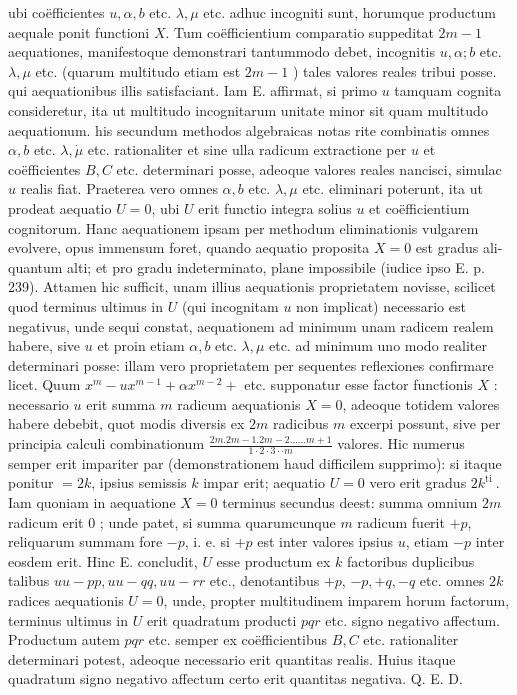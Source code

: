 \documentclass[10pt]{article}
\begin{document}
ubi coëfficientes \(u, \alpha, b\) etc. \(\lambda, \mu\) etc. adhuc incogniti sunt, horumque productum aequale ponit functioni \(X\). Tum coëfficientium comparatio suppeditat \(2 m-1\) aequationes, manifestoque demonstrari tantummodo debet, incognitis \(u, \alpha ; b\) etc. \(\lambda, \mu\) etc. (quarum multitudo etiam est \(2 m-1\) ) tales valores reales tribui posse. qui aequationibus illis satisfaciant. Iam E. affirmat, si primo \(u\) tamquam cognita consideretur, ita ut multitudo incognitarum unitate minor sit quam multitudo aequationum. his secundum methodos algebraicas notas rite combinatis omnes \(\alpha, b\) etc. \(\lambda, \dot{\mu}\) etc. rationaliter et sine ulla radicum extractione per \(u\) et coëfficientes \(B, C\) etc. determinari posse, adeoque valores reales nancisci, simulac \(u\) realis fiat. Praeterea vero omnes \(\alpha, b\) etc. \(\lambda, \mu\) etc. eliminari poterunt, ita ut prodeat aequatio \(U=0\), ubi \(U\) erit functio integra solius \(u\) et coëfficientium cognitorum. Hanc aequationem ipsam per methodum eliminationis vulgarem evolvere, opus immensum foret, quando aequatio proposita \(X=0\) est gradus ali-
quantum alti; et pro gradu indeterminato, plane impossibile (iudice ipso E. p. 239). Attamen hic sufficit, unam illius aequationis proprietatem novisse, scilicet quod terminus ultimus in \(U\) (qui incognitam \(u\) non implicat) necessario est negativus, unde sequi constat, aequationem ad minimum unam radicem realem habere, sive \(u\) et proin etiam \(\alpha, b\) etc. \(\lambda, \mu\) etc. ad minimum uno modo realiter determinari posse: illam vero proprietatem per sequentes reflexiones confirmare licet. Quum \(x^{m}-u x^{m-1}+\alpha x^{m-2}+\) etc. supponatur esse factor functionis \(X\) : necessario \(u\) erit summa \(m\) radicum aequationis \(X=0\), adeoque totidem valores habere debebit, quot modis diversis ex \(2 m\) radicibus \(m\) excerpi possunt, sive per principia calculi combinationum \(\frac{2 m .2 m-1.2 m-2 \ldots \ldots m+1}{1 \cdot 2 \cdot 3 \cdot \cdot m}\) valores. Hic numerus semper erit impariter par (demonstrationem haud difficilem supprimo): si itaque ponitur \(=2 k\), ipsius semissis \(k\) impar erit; aequatio \(U=0\) vero erit gradus \(2 k^{\text {ti }}\). Iam quoniam in aequatione \(X=0\) terminus secundus deest: summa omnium \(2 m\) radicum erit 0 ; unde patet, si summa quarumcunque \(m\) radicum fuerit \(+p\), reliquarum summam fore \(-p\), i. e. si \(+p\) est inter valores ipsius \(u\), etiam \(-p\) inter eosdem erit. Hinc E. concludit, \(U\) esse productum ex \(k\) factoribus duplicibus talibus \(u u-p p, u u-q q, u u-r r\) etc., denotantibus \(+p\), \(-p,+q,-q\) etc. omnes \(2 k\) radices aequationis \(U=0\), unde, propter multitudinem imparem horum factorum, terminus ultimus in \(U\) erit quadratum producti \(p q r\) etc. signo negativo affectum. Productum autem \(p q r\) etc. semper ex coëfficientibus \(B, C\) etc. rationaliter determinari potest, adeoque necessario erit quantitas realis. Huius itaque quadratum signo negativo affectum certo erit quantitas negativa. Q. E. D.
\end{document}
